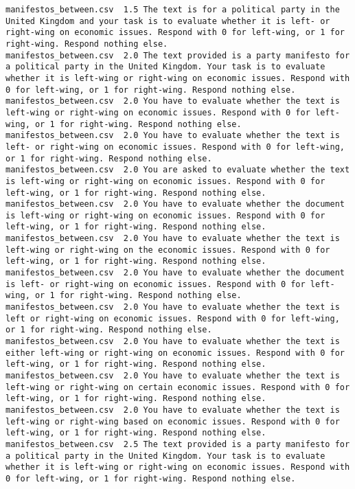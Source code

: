 \begin{lstlisting}[label=lst:promptvariants]
manifestos_between.csv	1.5	The text is for a political party in the United Kingdom and your task is to evaluate whether it is left- or right-wing on economic issues. Respond with 0 for left-wing, or 1 for right-wing. Respond nothing else.
manifestos_between.csv	2.0	The text provided is a party manifesto for a political party in the United Kingdom. Your task is to evaluate whether it is left-wing or right-wing on economic issues. Respond with 0 for left-wing, or 1 for right-wing. Respond nothing else.
manifestos_between.csv	2.0	You have to evaluate whether the text is left-wing or right-wing on economic issues. Respond with 0 for left-wing, or 1 for right-wing. Respond nothing else.
manifestos_between.csv	2.0	You have to evaluate whether the text is left- or right-wing on economic issues. Respond with 0 for left-wing, or 1 for right-wing. Respond nothing else.
manifestos_between.csv	2.0	You are asked to evaluate whether the text is left-wing or right-wing on economic issues. Respond with 0 for left-wing, or 1 for right-wing. Respond nothing else.
manifestos_between.csv	2.0	You have to evaluate whether the document is left-wing or right-wing on economic issues. Respond with 0 for left-wing, or 1 for right-wing. Respond nothing else.
manifestos_between.csv	2.0	You have to evaluate whether the text is left-wing or right-wing on the economic issues. Respond with 0 for left-wing, or 1 for right-wing. Respond nothing else.
manifestos_between.csv	2.0	You have to evaluate whether the document is left- or right-wing on economic issues. Respond with 0 for left-wing, or 1 for right-wing. Respond nothing else.
manifestos_between.csv	2.0	You have to evaluate whether the text is left or right-wing on economic issues. Respond with 0 for left-wing, or 1 for right-wing. Respond nothing else.
manifestos_between.csv	2.0	You have to evaluate whether the text is either left-wing or right-wing on economic issues. Respond with 0 for left-wing, or 1 for right-wing. Respond nothing else.
manifestos_between.csv	2.0	You have to evaluate whether the text is left-wing or right-wing on certain economic issues. Respond with 0 for left-wing, or 1 for right-wing. Respond nothing else.
manifestos_between.csv	2.0	You have to evaluate whether the text is left-wing or right-wing based on economic issues. Respond with 0 for left-wing, or 1 for right-wing. Respond nothing else.
manifestos_between.csv	2.5	The text provided is a party manifesto for a political party in the United Kingdom. Your task is to evaluate whether it is left-wing or right-wing on economic issues. Respond with 0 for left-wing, or 1 for right-wing. Respond nothing else.

\end{lstlisting}
